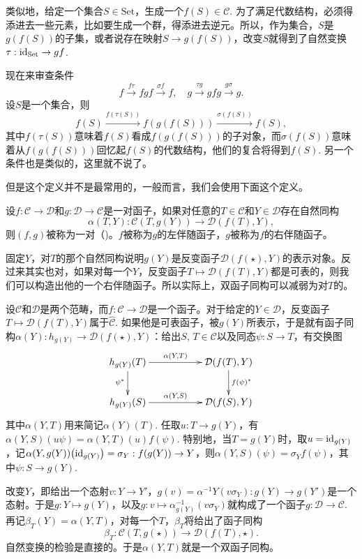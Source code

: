 类似地，给定一个集合$S\in \text{Set}$，生成一个$f(S)\in \mathcal{C}$. 为了满足代数结构，必须得添进去一些元素，比如要生成一个群，得添进去逆元。所以，作为集合，$S$是$g(f(S))$的子集，或者说存在映射$S\to g(f(S))$，改变$S$就得到了自然变换$\tau:\operatorname{id}_{\text{Set}}\to gf$.

现在来审查条件
\[
	f\xrightarrow{f\tau}fgf\xrightarrow{\sigma f}f,\quad g\xrightarrow{\tau g}gfg\xrightarrow{g\sigma}g.
\]
设$S$是一个集合，则
\[
	f(S)\xrightarrow{f(\tau(S))}f(g(f(S)))\xrightarrow{\sigma(f(S))}f(S),
\]
其中$f(\tau(S))$意味着$f(S)$看成$f(g(f(S)))$的子对象，而$\sigma(f(S))$意味着从$f(g(f(S)))$回忆起$f(S)$的代数结构，他们的复合将得到$f(S)$. 另一个条件也是类似的，这里就不说了。

但是这个定义并不是最常用的，一般而言，我们会使用下面这个定义。

\para 设$f:\mathcal{C}\to \mathcal{D}$和$g:\mathcal{D}\to \mathcal{C}$是一对函子，如果对任意的$T\in\mathcal{C}$和$Y\in\mathcal{D}$存在自然同构
\[
	\alpha(T,Y):\mathcal{C}(T,g(Y))\to \mathcal{D}(f(T),Y),
\]
则$(f,g)$被称为一对（)。$f$被称为$g$的左伴随函子，$g$被称为$f$的右伴随函子。

固定$Y$，对$T$的那个自然同构说明$g(Y)$是反变函子$\mathcal{D}(f(\star),Y)$的表示对象。反过来其实也对，如果对每一个$Y$，反变函子$T\mapsto {\mathcal{D}}(f(T),Y)$都是可表的，则我们可以构造出他的一个右伴随函子。所以实际上，双函子同构可以减弱为对$T$的。

\para 设$\mathcal{C}$和$\mathcal{D}$是两个范畴，而$f:\mathcal{C}\to \mathcal{D}$是一个函子。对于给定的$Y\in\mathcal{D}$，反变函子$T\mapsto {\mathcal{D}}(f(T),Y)$属于$\hat{\mathcal{C}}$. 如果他是可表函子，被$g(Y)$所表示，于是就有函子同构$\alpha(Y):h_{g(Y)}\to {\mathcal{D}}(f(\star),Y)$：给出$S$, $T\in \mathcal{C}$以及同态$\psi:S\to T$，有交换图
\[
\begin{xy}
	\xymatrix{
		h_{g(Y)}(T)\ar[rr]^-{\alpha(Y,T)} \ar[d]_{\psi^*}&&{\mathcal{D}}(f(T),Y) \ar[d]^{f(\psi)^*}\\
		h_{g(Y)}(S)\ar[rr]^-{\alpha(Y,S)}&&{\mathcal{D}}(f(S),Y)
	}
\end{xy}
\]
其中$\alpha(Y,T)$用来简记$\alpha(Y)(T)$. 任取$u:T\to {g(Y)}$，有$\alpha(Y,S)(u\psi)=\alpha(Y,T)(u)f(\psi)$. 特别地，当$T=g(Y)$时，取$u=\operatorname{id}_{g(Y)}$，记$\alpha(Y,g(Y))\bigl(\operatorname{id}_{g(Y)}\bigr)=\sigma_Y:f(g(Y))\to Y$，则$\alpha(Y,S)(\psi)=\sigma_Y f(\psi)$，其中$\psi:S\to g(Y)$.

改变$Y$，即给出一个态射$v:Y\to Y'$，$g(v)=\alpha^{-1}{Y}\left(v\sigma_Y\right):g(Y)\to g(Y')$是一个态射。于是$g:Y\mapsto g(Y)$，以及$g:v\mapsto \alpha^{-1}_{g(Y)}\left(v\sigma_Y\right)$就构成了一个函子$g:\mathcal{D}\to \mathcal{C}$. 再记$\beta_T(Y)=\alpha(Y,T)$，对每一个$T$，$\beta_T$将给出了函子同构
\[
	\beta_T:\mathcal{C}(T,g(\star))\to \mathcal{D}(f(T),\star).
\]
自然变换的检验是直接的。于是$\alpha(Y,T)$就是一个双函子同构。


